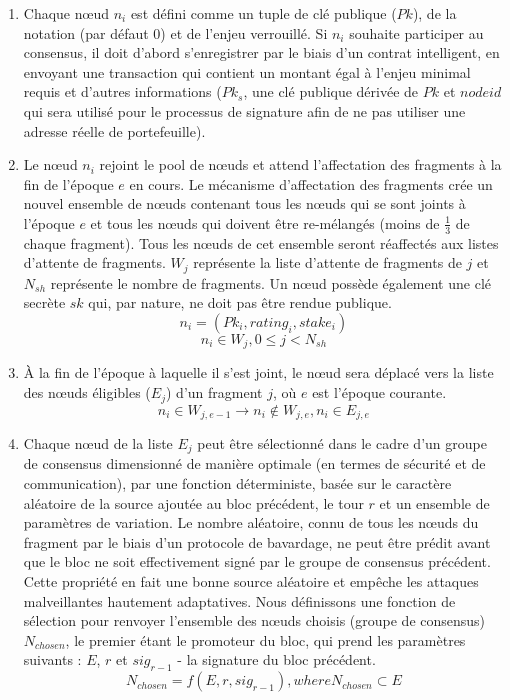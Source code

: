 \documentclass[journal]{IEEEtran}
\begin{document}
\begin{enumerate}

 \item  Chaque nœud ${n}_{i}$ est défini comme un tuple de clé publique ($Pk$), de la notation (par défaut 0) et de l'enjeu verrouillé. Si ${n}_{i}$ souhaite participer au consensus, il doit d'abord s'enregistrer par le biais d'un contrat intelligent, en envoyant une transaction qui contient un montant égal à l'enjeu minimal requis et d'autres informations (${Pk}_{s}$, une clé publique dérivée de  $Pk$ et $nodeid$ qui sera utilisé pour le processus de signature afin de ne pas utiliser une adresse réelle de portefeuille).

\item Le nœud ${n}_{i}$  rejoint le pool de nœuds et attend l'affectation des fragments à la fin de l'époque $e$ en cours. Le mécanisme d'affectation des fragments crée un nouvel ensemble de nœuds contenant tous les nœuds qui se sont joints à l'époque $e$ et tous les nœuds qui doivent être re-mélangés (moins de $\frac{1}{3}$ de chaque fragment). Tous les nœuds de cet ensemble seront réaffectés aux listes d'attente de fragments. ${W}_{j}$ représente la liste d'attente de fragments de $j$ et ${N}_{sh}$  représente le nombre de fragments. Un nœud possède également une clé secrète $sk$ qui, par nature, ne doit pas être rendue publique.
\[{n}_{i}=({Pk}_{i},{rating}_{i},{stake}_{i})\]
\[{n}_{i} \in {W}_{j},0 \le j<{N}_{sh}\]

\item À la fin de l'époque à laquelle il s'est joint, le nœud sera déplacé vers la liste des nœuds éligibles (${E}_{j}$) d'un fragment $j$, où $e$ est l'époque courante.
\[{n}_{i} \in {W}_{j,e-1} \to {n}_{i} \notin {W}_{j,e},{n}_{i} \in {E}_{j,e}\]

\item Chaque nœud de la liste ${E}_{j}$ peut être sélectionné dans le cadre d'un groupe de consensus dimensionné de manière optimale (en termes de sécurité et de communication), par une fonction déterministe, basée sur le caractère aléatoire de la source ajoutée au bloc précédent, le tour $r$ et un ensemble de paramètres de variation. Le nombre aléatoire, connu de tous les nœuds du fragment par le biais d'un protocole de bavardage, ne peut être prédit avant que le bloc ne soit effectivement signé par le groupe de consensus précédent. Cette propriété en fait une bonne source aléatoire et empêche les attaques malveillantes hautement adaptatives. Nous définissons une fonction de sélection pour renvoyer l'ensemble des nœuds choisis (groupe de consensus) ${N}_{chosen}$, le premier étant le promoteur du bloc, qui prend les paramètres suivants : $E$, $r$ et ${sig}_{r-1}$ - la signature du bloc précédent.
\[{N}_{chosen}=f(E,r,{sig}_{r-1}), {where } {N}_{chosen} \subset E\]


\end{enumerate}
\end{document}
